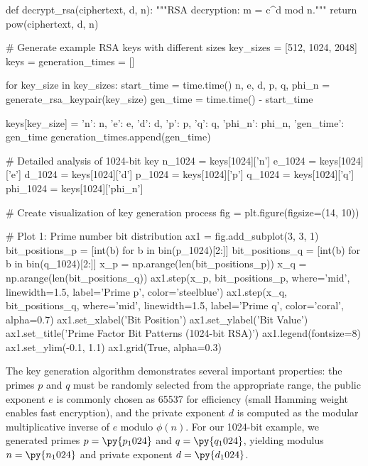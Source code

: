 \documentclass[a4paper, 11pt]{article}
\begin{document}
\begin{pycode}
def decrypt_rsa(ciphertext, d, n):
    """RSA decryption: m = c^d mod n."""
    return pow(ciphertext, d, n)

# Generate example RSA keys with different sizes
key_sizes = [512, 1024, 2048]
keys = {}
generation_times = []

for key_size in key_sizes:
    start_time = time.time()
    n, e, d, p, q, phi_n = generate_rsa_keypair(key_size)
    gen_time = time.time() - start_time

    keys[key_size] = {
        'n': n, 'e': e, 'd': d, 'p': p, 'q': q,
        'phi_n': phi_n, 'gen_time': gen_time
    }
    generation_times.append(gen_time)

# Detailed analysis of 1024-bit key
n_1024 = keys[1024]['n']
e_1024 = keys[1024]['e']
d_1024 = keys[1024]['d']
p_1024 = keys[1024]['p']
q_1024 = keys[1024]['q']
phi_1024 = keys[1024]['phi_n']

# Create visualization of key generation process
fig = plt.figure(figsize=(14, 10))

# Plot 1: Prime number bit distribution
ax1 = fig.add_subplot(3, 3, 1)
bit_positions_p = [int(b) for b in bin(p_1024)[2:]]
bit_positions_q = [int(b) for b in bin(q_1024)[2:]]
x_p = np.arange(len(bit_positions_p))
x_q = np.arange(len(bit_positions_q))
ax1.step(x_p, bit_positions_p, where='mid', linewidth=1.5, label='Prime p', color='steelblue')
ax1.step(x_q, bit_positions_q, where='mid', linewidth=1.5, label='Prime q', color='coral', alpha=0.7)
ax1.set_xlabel('Bit Position')
ax1.set_ylabel('Bit Value')
ax1.set_title('Prime Factor Bit Patterns (1024-bit RSA)')
ax1.legend(fontsize=8)
ax1.set_ylim(-0.1, 1.1)
ax1.grid(True, alpha=0.3)
\end{pycode}

The key generation algorithm demonstrates several important properties: the primes $p$ and
$q$ must be randomly selected from the appropriate range, the public exponent $e$ is commonly
chosen as 65537 for efficiency (small Hamming weight enables fast encryption), and the
private exponent $d$ is computed as the modular multiplicative inverse of $e$ modulo
$\phi(n)$. For our 1024-bit example, we generated primes $p = \py{p_1024}$ and
$q = \py{q_1024}$, yielding modulus $n = \py{n_1024}$ and private exponent $d = \py{d_1024}$.
\end{document}
